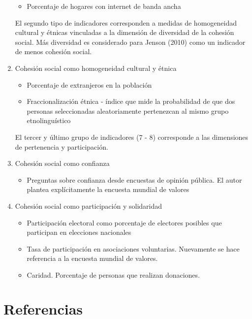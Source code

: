 \documentclass[
  12pt,
]{book}
\providecommand{\tightlist}{%
  \setlength{\itemsep}{0pt}\setlength{\parskip}{0pt}}
\begin{document}
\begin{enumerate}
  \begin{itemize}
  \tightlist
  \item
    Porcentaje de hogares con internet de banda ancha
  \end{itemize}

  El segundo tipo de indicadores corresponden a medidas de
  homogeneidad cultural y étnicas vinculadas a la dimensión de
  diversidad de la cohesión social. Más diversidad es considerado para
  Jenson (2010) como un indicador de menos cohesión social.
\item
  Cohesión social como homogeneidad cultural y étnica

  \begin{itemize}
  \item
    Porcentaje de extranjeros en la población
  \item
    Fraccionalización étnica - índice que mide la probabilidad de
    que dos personas seleccionadas aleatoriamente pertenezcan al
    mismo grupo etnolinguístico
  \end{itemize}

  El tercer y último grupo de indicadores (7 - 8) corresponde a las
  dimensiones de pertenencia y participación.
\item
  Cohesión social como confianza

  \begin{itemize}
  \tightlist
  \item
    Preguntas sobre confianza desde encuestas de opinión pública. El
    autor plantea explícitamente la encuesta mundial de valores
  \end{itemize}
\item
  Cohesión social como participación y solidaridad

  \begin{itemize}
  \item
    Participación electoral como porcentaje de electores posibles
    que participan en elecciones nacionales
  \item
    Tasa de participación en asociaciones voluntarias. Nuevamente se
    hace referencia a la encuesta mundial de valores.
  \item
    Caridad. Porcentaje de personas que realizan donaciones.
  \end{itemize}
\end{enumerate}

\hypertarget{referencias}{%
\section{Referencias}\label{referencias}}
\end{document}
